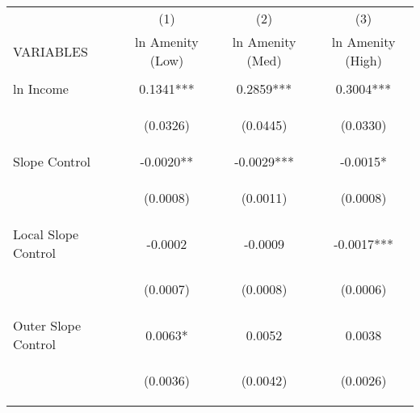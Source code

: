 
\begin{tabular}{lccc} \hline
 & (1) & (2) & (3) \\
VARIABLES & ln Amenity (Low) & ln Amenity (Med) & ln Amenity (High) \\ \hline
\vspace{4pt} & \begin{footnotesize}\end{footnotesize} & \begin{footnotesize}\end{footnotesize} & \begin{footnotesize}\end{footnotesize} \\
ln Income & 0.1341*** & 0.2859*** & 0.3004*** \\
\vspace{4pt} & \begin{footnotesize}(0.0326)\end{footnotesize} & \begin{footnotesize}(0.0445)\end{footnotesize} & \begin{footnotesize}(0.0330)\end{footnotesize} \\
Slope Control & -0.0020** & -0.0029*** & -0.0015* \\
\vspace{4pt} & \begin{footnotesize}(0.0008)\end{footnotesize} & \begin{footnotesize}(0.0011)\end{footnotesize} & \begin{footnotesize}(0.0008)\end{footnotesize} \\
Local Slope Control & -0.0002 & -0.0009 & -0.0017*** \\
\vspace{4pt} & \begin{footnotesize}(0.0007)\end{footnotesize} & \begin{footnotesize}(0.0008)\end{footnotesize} & \begin{footnotesize}(0.0006)\end{footnotesize} \\
Outer Slope Control & 0.0063* & 0.0052 & 0.0038 \\
 & \begin{footnotesize}(0.0036)\end{footnotesize} & \begin{footnotesize}(0.0042)\end{footnotesize} & \begin{footnotesize}(0.0026)\end{footnotesize} \\

\end{tabular}
